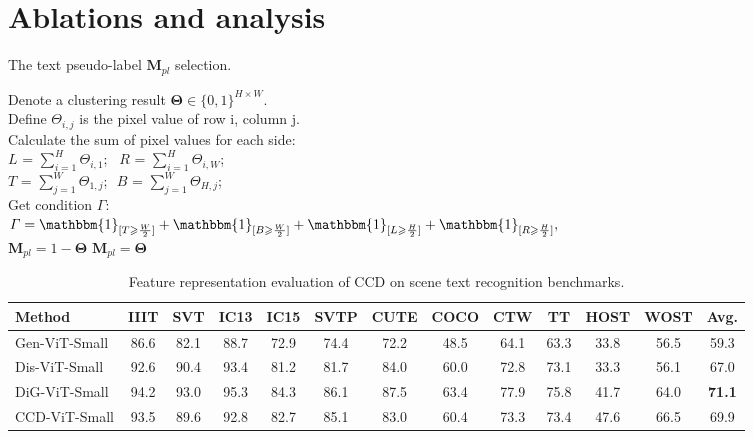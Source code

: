 \documentclass[10pt,twocolumn,letterpaper]{article}
\begin{document}
\section{Ablations and analysis}
\begin{algorithm}[t]
\small
     \caption{The text pseudo-label $\mathbf{M}_{pl}$ selection.}
     \label{training_BoxDQN}
     Denote a clustering result $\bm{\Theta} \in
\{0, 1\}^{H\times W}$.\\
    Define $\Theta_{i,j}$ is the pixel value of 
    row i, column j.\\
    Calculate the sum of pixel values for each side:\\
     $L$ = $\sum_{i=1}^{H}\Theta_{i,1}$;\,\,\,
     $R$ = $\sum_{i=1}^{H}\Theta_{i,W}$;\\
     $T$ = $\sum_{j=1}^{W}\Theta_{1,j}$;\,\,
     $B$ = $\sum_{j=1}^{W}\Theta_{H,j}$; \\
     Get condition $\varGamma$:\\
     $\varGamma = \mathbbm{1}_{[T \geqslant \frac{W}{2}]} + \mathbbm{1}_{[B \geqslant \frac{W}{2}]} + \mathbbm{1}_{[L \geqslant \frac{H}{2}]} + \mathbbm{1}_{[R \geqslant \frac{H}{2}]},$\\
             {
                 $\mathbf{M}_{pl}=1-\bm{\Theta}$
             }
             {
                 $\mathbf{M}_{pl}=\bm{\Theta}$
             }
    \vspace{-0.2em}
\end{algorithm}
\begin{table*}[t]
  \centering
  \caption{Feature representation evaluation of CCD on scene text recognition benchmarks.}
    \begin{tabular}{l|ccccccccccc|c}
    \toprule
    Method & IIIT & SVT & IC13 & IC15 & SVTP & CUTE & COCO & CTW & TT &HOST &WOST &Avg.\\
    \midrule
    Gen-ViT-Small &86.6 &82.1 &88.7 &72.9 &74.4 & 72.2 &48.5&64.1 &63.3&33.8&56.5&59.3\\
    Dis-ViT-Small &92.6 &90.4 &93.4 &81.2 &81.7 & 84.0 &60.0&72.8 &73.1&33.3&56.1&67.0\\
    DiG-ViT-Small &94.2 &93.0 &95.3 &84.3 &86.1 &87.5&63.4&77.9 &75.8&41.7&64.0&\textbf{71.1}\\
    \rowcolor{mygray}
    CCD-ViT-Small &93.5 &89.6 &92.8 &82.7 &85.1 &83.0 &60.4 &73.3&73.4&47.6&66.5&69.9  \\
    \bottomrule
    \end{tabular}
  \label{tb:feature evaluation}
  \vspace{-0.5em}
  \end{table*}
\end{document}
